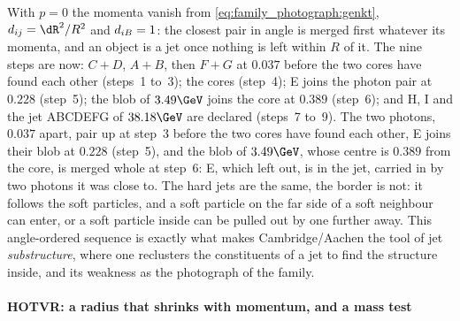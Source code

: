 With $p=0$ the momenta vanish from \cref{eq:family_photograph:genkt},
$\dij=\dR^2/R^2$ and $d_{iB}=1$: the closest pair in angle is merged first
whatever its momenta, and an object is a jet once nothing is left within
$R$ of it.
The nine steps are now: $C+D$, $A+B$, then $F+G$ at $0.037$ before
the two cores have found each other (steps~1 to~3); the cores (step~4);
E joins the photon pair at $0.228$ (step~5); the blob of $3.49\GeV$ joins
the core at $0.389$ (step~6); and H, I and the jet ABCDEFG of $38.18\GeV$
are declared (steps~7 to~9).
The two photons, $0.037$ apart, pair up at step~3 before the two cores
have found each other, E joins their blob at $0.228$ (step~5), and the
blob of $3.49\GeV$, whose centre is $0.389$ from the core, is merged
whole at step~6: E, which \antikt left out, is in the jet, carried in by
two photons it was close to. The hard jets are the same, the border is
not: it follows the soft particles, and a soft particle on the far side
of a soft neighbour can enter, or a soft particle inside can be pulled
out by one further away. This angle-ordered sequence is exactly what
makes Cambridge/Aachen the tool of jet \emph{substructure}, where one
reclusters the constituents of a jet to find the structure inside, and
its weakness as the photograph of the family.

\paragraph{HOTVR: a radius that shrinks with momentum, and a mass test}

